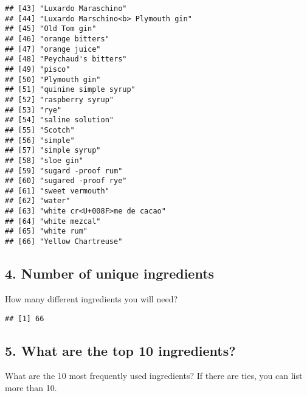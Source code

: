 \documentclass[
]{article}
\newenvironment{Shaded}{\begin{snugshade}}{\end{snugshade}}
\newcommand{\KeywordTok}[1]{\textcolor[rgb]{0.13,0.29,0.53}{\textbf{#1}}}
\newcommand{\NormalTok}[1]{#1}
\newcommand{\OperatorTok}[1]{\textcolor[rgb]{0.81,0.36,0.00}{\textbf{#1}}}
\begin{document}
\begin{verbatim}
## [43] "Luxardo Maraschino"                    
## [44] "Luxardo Marschino<b> Plymouth gin"     
## [45] "Old Tom gin"                           
## [46] "orange bitters"                        
## [47] "orange juice"                          
## [48] "Peychaud's bitters"                    
## [49] "pisco"                                 
## [50] "Plymouth gin"                          
## [51] "quinine simple syrup"                  
## [52] "raspberry syrup"                       
## [53] "rye"                                   
## [54] "saline solution"                       
## [55] "Scotch"                                
## [56] "simple"                                
## [57] "simple syrup"                          
## [58] "sloe gin"                              
## [59] "sugard -proof rum"                     
## [60] "sugared -proof rye"                    
## [61] "sweet vermouth"                        
## [62] "water"                                 
## [63] "white cr<U+008F>me de cacao"           
## [64] "white mezcal"                          
## [65] "white rum"                             
## [66] "Yellow Chartreuse"
\end{verbatim}

\hypertarget{number-of-unique-ingredients}{%
\subsection{4. Number of unique
ingredients}\label{number-of-unique-ingredients}}

How many different ingredients you will need?

\begin{Shaded}
\end{Shaded}

\begin{verbatim}
## [1] 66
\end{verbatim}

\hypertarget{what-are-the-top-10-ingredients}{%
\subsection{5. What are the top 10
ingredients?}\label{what-are-the-top-10-ingredients}}

What are the 10 most frequently used ingredients? If there are ties, you
can list more than 10.
\end{document}
